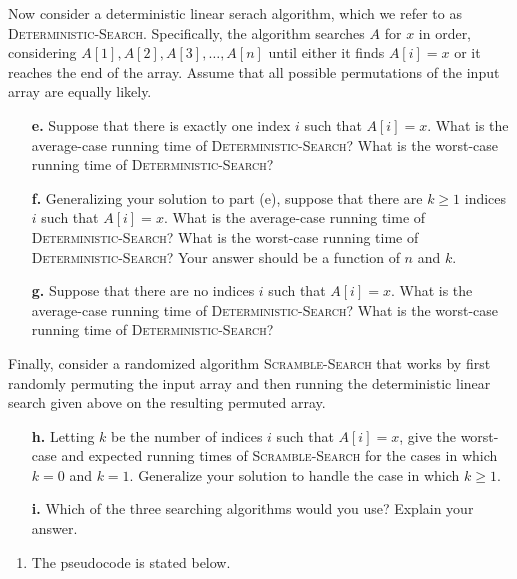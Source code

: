 \documentclass{report}
\makeatletter
\renewenvironment{framed}{%
 \def\FrameCommand##1{\hskip\@totalleftmargin
 \fboxsep=\FrameSep\fbox{##1}}%
 \MakeFramed {\advance\hsize-\width
   \@totalleftmargin\z@ \linewidth\hsize
   \@setminipage}}%
 {\par\unskip\endMakeFramed}
\makeatother
\begin{document}
\begin{enumerate}
{Now consider a deterministic linear serach algorithm, which we refer to as
\textsc{Deterministic-Search}. Specifically, the algorithm searches $A$ for $x$
in order, considering $A[1], A[2], A[3], \dots, A[n]$ until either it finds
$A[i] = x$ or it reaches the end of the array. Assume that all possible
permutations of the input array are equally likely.

\begin{enumerate}
\item[\textbf{e.}] Suppose that there is exactly one index $i$ such that
$A[i] = x$. What is the average-case running time of
\textsc{Deterministic-Search}?  What is the worst-case running time of
\textsc{Deterministic-Search}?
\item[\textbf{f.}] Generalizing your solution to part (e), suppose that there
are $k \ge 1$ indices $i$ such that $A[i] = x$. What is the average-case running
time of \textsc{Deterministic-Search}? What is the worst-case running time of
\textsc{Deterministic-Search}? Your answer should be a function of $n$ and $k$.
\item[\textbf{g.}] Suppose that there are no indices $i$ such that $A[i] = x$.
What is the average-case running time of \textsc{Deterministic-Search}? What
is the worst-case running time of \textsc{Deterministic-Search}?
\end{enumerate}

Finally, consider a randomized algorithm \textsc{Scramble-Search} that works by
first randomly permuting the input array and then running the deterministic
linear search given above on the resulting permuted array.

\begin{enumerate}
\item[\textbf{h.}] Letting $k$ be the number of indices $i$ such that
$A[i] = x$, give the worst-case and expected running times of
\textsc{Scramble-Search} for the cases in which $k = 0$ and $k = 1$. Generalize
your solution to handle the case in which $k \ge 1$.
\item[\textbf{i.}] Which of the three searching algorithms would you use?
Explain your answer.
\end{enumerate}
}

\begin{framed}
\begin{enumerate}
\item The pseudocode is stated below.

\begin{algorithm}[H]
\SetAlgoNoEnd\DontPrintSemicolon
\BlankLine
{}
\end{algorithm}


\end{enumerate}
\end{framed}
\end{enumerate}
\end{document}
